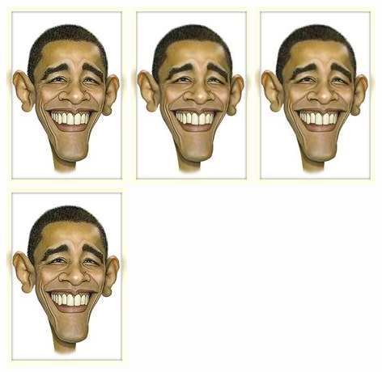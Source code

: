\documentclass[12pt]{article}
\begin{document}
    \\
    \includegraphics[angle=90]{obama.jpg}
    \includegraphics[angle=180]{obama.jpg}
    \includegraphics[angle=270]{obama.jpg} \\
    \includegraphics[angle=90,origin=c]{obama.jpg}
\end{document}
